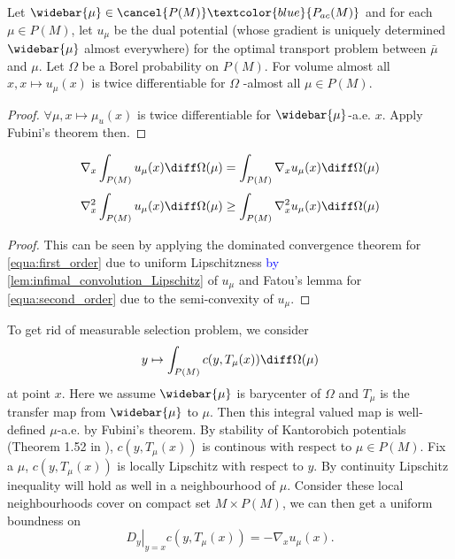 \begin{lem}
	Let \( \widebar { \mu } \in \cancel{P ( M )} \textcolor{blue}{P_{ac}(M)}\) and for each \( \mu \in P ( M ) \), let \( u _ { \mu } \) be the dual potential (whose gradient is uniquely determined \( \widebar { \mu } \) almost everywhere) for the optimal transport problem between \( \bar { \mu } \) and \( \mu . \) Let \( \Omega \) be a Borel probability on \( P ( M ) . \) For volume almost all \( x , x \mapsto u _ { \mu } ( x ) \) is twice differentiable for \( \Omega \) -almost all \( \mu \in P ( M ) . \)
\end{lem}

\begin{proof}
	$\forall \mu, x \mapsto \mu_u(x)$ is twice differentiable for $\widebar{\mu}$-a.e. $x$. Apply Fubini's theorem then.
\end{proof}

\begin{prop} 
	\begin{equation}
		\label{equa:first_order}
		\nabla _ { x } \int _ { P ( M ) } u _ { \mu } ( x ) \diff \Omega ( \mu ) = \int _ { P ( M ) } \nabla _ { x } u _ { \mu } ( x ) \diff \Omega ( \mu )
	\end{equation}
	\begin{equation}
		\label{equa:second_order}
		\nabla _ { x } ^ { 2 } \int _ { P ( M ) } u _ { \mu } ( x ) \diff \Omega ( \mu ) \geq \int _ { P ( M ) } \nabla _ { x } ^ { 2 } u _ { \mu } ( x ) \diff \Omega ( \mu )
	\end{equation}
\end{prop}

\begin{proof}
	This can be seen by applying the dominated convergence theorem for \cref{equa:first_order} due to uniform Lipschitzness \textcolor{blue}{by \cref{lem:infimal_convolution_Lipschitz}} of \( u _ { \mu } \) and Fatou's lemma for \cref{equa:second_order} due to the semi-convexity
	of \( u _ { \mu } . \)
\end{proof}

To get rid of measurable selection problem, we consider
\[ y \mapsto \int_{P(M)} c(y, T_{\mu}(x)) \diff \Omega ( \mu)\]
at point $x$.
Here we assume $\widebar{\mu}$ is barycenter of $\Omega$ and $T_{\mu}$ is the transfer map from $\widebar{\mu}$ to $\mu$.
Then this integral valued map is well-defined $\mu$-a.e. by Fubini's theorem.
By stability of Kantorobich potentials (Theorem 1.52 in \cite{Santambrogio2015}), $c(y, T_{\mu}(x))$ is continous with respect to $\mu \in P(M)$.
Fix a $\mu$, $c(y, T_{\mu}(x))$ is locally Lipschitz with respect to $y$.
By continuity Lipschitz inequality will hold as well in a neighbourhood of $\mu$.
Consider these local neighbourhoods cover on compact set $ M \times P(M)$,
we can then get a uniform boundness on
\[\left. D_y\right|_{y=x} c(y, T_{\mu}(x)) = - \nabla_x u_{\mu}(x).\]


